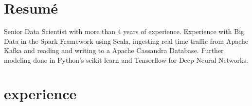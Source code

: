 \documentclass[]{friggeri-cv}
\begin{document}
\section{Resumé}

Senior Data Scientist with more than 4 years of experience. Experience with Big Data in the Spark Framework using Scala, ingesting real time traffic from Apache Kafka and reading and writing to a Apache Cassandra Database. Further modeling done in Python's scikit learn and Tensorflow for Deep Neural Networks.%






\section{experience}
\end{document}
